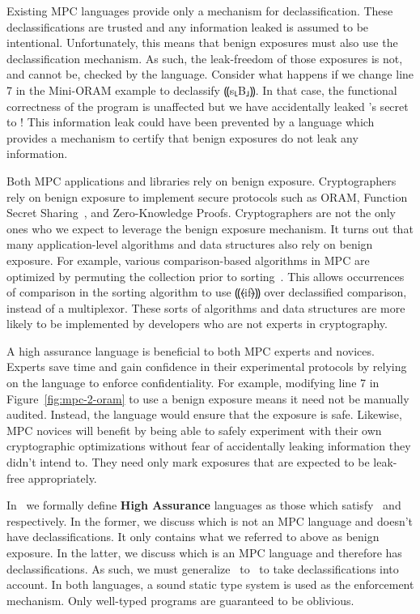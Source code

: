 Existing MPC languages provide only a mechanism for declassification. These declassifications are trusted and any
information leaked is assumed to be intentional. Unfortunately, this means that benign exposures must also use the
declassification mechanism. As such, the leak-freedom of those exposures is not, and cannot be, checked by the language.
Consider what happens if we change line 7 in the Mini-ORAM example to declassify ⸨s⸤B⸥⸩.
In that case, the functional correctness of the program is unaffected but we have accidentally leaked \bob's secret to \alice!
This information leak could have been prevented by a language which provides a mechanism to certify that benign exposures do
not leak any information.

Both MPC applications and libraries rely on benign exposure. Cryptographers rely on benign exposure to implement secure protocols such as ORAM,
Function Secret Sharing~\cite{}, and Zero-Knowledge Proofs\cite{}. Cryptographers are not the only ones who we expect to leverage the
benign exposure mechanism. It turns out that many application-level algorithms and data structures also rely on benign exposure. For example,
various comparison-based algorithms in MPC are optimized by permuting the collection prior to sorting~\cite{hamada2012}. This allows occurrences of
comparison in the sorting algorithm to use ⸨⦑if⦒⸩ over declassified comparison, instead of a multiplexor. These sorts of algorithms and
data structures are more likely to be implemented by developers who are not experts in cryptography.

A high assurance language is beneficial to both MPC experts and novices. Experts save time and gain confidence in their
experimental protocols by relying on the language to enforce confidentiality. For example, modifying line 7 in
Figure~\ref{fig:mpc-2-oram} to use a benign exposure means it need not be manually audited. Instead, the language would ensure that the
exposure is safe. Likewise, MPC novices will benefit by being able to safely experiment with their own cryptographic optimizations
without fear of accidentally leaking information they didn't intend to. They need only mark exposures that are expected to be
leak-free appropriately.

In~ we formally define \textbf{High Assurance} languages as those which satisfy~ and~
respectively. In the former, we discuss \obliv which is not an MPC language and doesn't have declassifications. It only contains what we referred to above
as benign exposure. In the latter, we discuss \lang which is an MPC language and therefore has declassifications. As such, we must generalize~
to~ to take declassifications into account. In both languages, a sound static type system is used as the enforcement mechanism. Only well-typed
programs are guaranteed to be oblivious.
